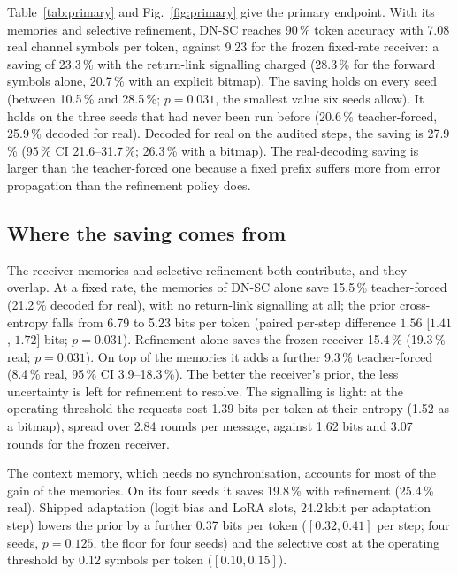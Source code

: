 Table~\ref{tab:primary} and Fig.~\ref{fig:primary} give the primary endpoint.
With its memories and selective refinement, DN-SC reaches 90\,\% token
accuracy with 7.08 real channel symbols per token, against 9.23 for the frozen
fixed-rate receiver: a saving of 23.3\,\% with the return-link signalling
charged (28.3\,\% for the forward symbols alone, 20.7\,\% with an explicit
bitmap). The saving holds on every seed (between 10.5\,\% and 28.5\,\%;
$p = 0.031$, the smallest value six seeds allow). It holds on the three seeds
that had never been run before (20.6\,\% teacher-forced, 25.9\,\% decoded for
real). Decoded for real on the audited steps, the saving is 27.9\,\%
(95\,\% CI 21.6--31.7\,\%; 26.3\,\% with a bitmap). The real-decoding saving is
larger than the teacher-forced one because a fixed prefix suffers more from
error propagation than the refinement policy does.

\subsection{Where the saving comes from}
\label{sec:results-decomposition}

The receiver memories and selective refinement both contribute, and they
overlap. At a fixed rate, the memories of DN-SC alone save 15.5\,\%
teacher-forced (21.2\,\% decoded for real), with no return-link signalling at
all; the prior cross-entropy falls from 6.79 to 5.23 bits per token
(paired per-step difference $1.56$ [$1.41$, $1.72$] bits; $p = 0.031$).
Refinement alone saves the frozen receiver 15.4\,\% (19.3\,\% real; $p = 0.031$).
On top of the memories it adds a further 9.3\,\% teacher-forced (8.4\,\% real,
95\,\% CI 3.9--18.3\,\%). The better the receiver's prior, the less
uncertainty is left for refinement to resolve. The signalling is light: at the
operating threshold the requests cost 1.39 bits per token at their entropy
(1.52 as a bitmap), spread over 2.84 rounds per message, against 1.62 bits and
3.07 rounds for the frozen receiver.

The context memory, which needs no synchronisation, accounts for most of the
gain of the memories. On its four seeds it saves 19.8\,\% with refinement
(25.4\,\% real). Shipped adaptation (logit bias and LoRA slots, 24.2\,kbit per
adaptation step) lowers the prior by a further 0.37 bits per token
($[0.32, 0.41]$ per step; four seeds, $p = 0.125$, the floor for four seeds)
and the selective cost at the operating threshold by 0.12 symbols per token
($[0.10, 0.15]$).

